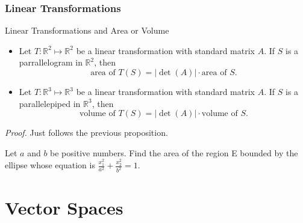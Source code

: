 \documentclass[10pt, a4paper]{article}
\newcommand{\R}{\mathbb{R}}
\begin{document}
\subsubsection*{Linear Transformations}
\begin{proposition}Linear Transformations and Area or Volume\\
    \begin{itemize}
        \item Let $T:\R^2\mapsto\R^2$ be a linear transformation with standard matrix $A$. If $S$ is a parrallelogram in $\R^2$, then $$
        {\text{area of } T(S)} = |\det(A)|\cdot {\text{area of } S}.
        $$
        \item Let $T:\R^3\mapsto\R^3$ be a linear transformation with standard matrix $A$. If $S$ is a parallelepiped in $\R^3$, then $$
        {\text{volume of } T(S)} = |\det(A)|\cdot {\text{volume of } S}.
        $$
    \end{itemize}
\end{proposition}
\indent\textit{Proof.} Just follows the previous proposition.
\begin{example}
    Let $a$ and $b$ be positive numbers. Find the area of the region E bounded by the ellipse whose equation is $\frac{x_1^2}{a^2} + \frac{x_2^2}{b^2} = 1$.\\
\end{example}

\newpage

\section{Vector Spaces}
\end{document}
